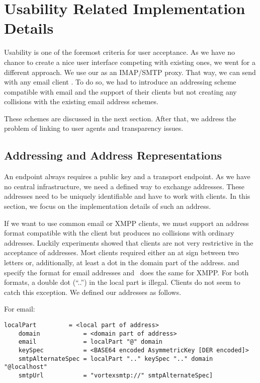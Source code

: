 \chapter{Usability Related Implementation Details}\label{sec:usabilityImplementation}
Usability is one of the foremost criteria for user acceptance. As we have no chance to create a nice user interface competing with existing ones, we went for a different approach. We use our \VortexNode{} as an IMAP/SMTP proxy. That way, we can send with any email client \VortexMessages. To do so, we had to introduce an addressing scheme compatible with email and the support of their clients but not creating any collisions with the existing email address schemes.

These schemes are discussed in the next section. After that, we address the problem of linking to user agents and transparency issues.

\section{Addressing and Address Representations}
An endpoint always requires a public key and a transport endpoint. As we have no central infrastructure, we need a defined way to exchange addresses. These addresses need to be uniquely identifiable and have to work with clients. In this section, we focus on the implementation details of such an address.

If we want to use common email or XMPP clients, we must support an address format compatible with the client but produces no collisions with ordinary addresses. Luckily experiments showed that clients are not very restrictive in the acceptance of addresses. Most clients required either an at sign between two letters or, additionally, at least a dot in the domain part of the address. \cite{rfc5321} and~\cite{rfc5322} specify the format for email addresses and~\cite{rfc6120} does the same for XMPP. For both formats, a double dot (``..'') in the local part is illegal. Clients do not seem to catch this exception. We defined our addresses as follows.


For email:
\begin{lstlisting}[language=EBNF]
	localPart         = <local part of address>
	domain            = <domain part of address>
	email             = localPart "@" domain
	keySpec           = <BASE64 encoded AsymmetricKey [DER encoded]>
	smtpAlternateSpec = localPart ".." keySpec ".." domain "@localhost"
	smtpUrl           = "vortexsmtp://" smtpAlternateSpec]
\end{lstlisting}

